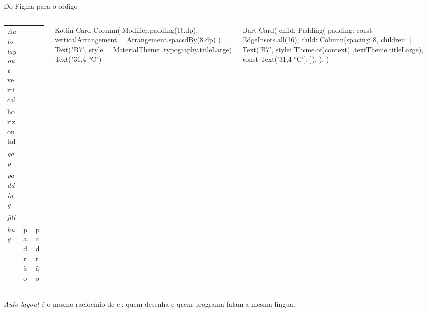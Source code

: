 \documentclass[aspectratio=169,10pt]{beamer}
\begin{document}
\begin{frame}[fragile]{Do Figma para o código}
  \begin{columns}[T]
    \begin{column}{0.33\textwidth}
      \scriptsize
      \begin{tabularx}{\linewidth}{@{}p{1.2cm} p{1.75cm} L@{}}
        \toprule
         &  &  \\
        \midrule
        \emph{Auto layout} vertical &  &  \\
        horizontal &  &  \\
        \emph{gap} &  &  \\
        \emph{padding} &  &  \\
        \emph{fill} &  &  \\
        \emph{hug} & padrão & padrão \\
        \bottomrule
      \end{tabularx}
    \end{column}
    \begin{column}{0.31\textwidth}
\begin{codigo}[title=Compose]{Kotlin}
Card {
  Column(
    Modifier.padding(16.dp),
    verticalArrangement =
      Arrangement.spacedBy(8.dp)
  ) {
    Text("B7", style = MaterialTheme
      .typography.titleLarge)
    Text("31,4 °C")
  }
}
\end{codigo}
    \end{column}
    \begin{column}{0.34\textwidth}
\begin{codigo}[title=Flutter]{Dart}
Card(
  child: Padding(
    padding: const EdgeInsets.all(16),
    child: Column(spacing: 8, children: [
      Text('B7', style: Theme.of(context)
          .textTheme.titleLarge),
      const Text('31,4 °C'),
    ]),
  ),
)
\end{codigo}
    \end{column}
  \end{columns}
  \begin{destaque}
    \emph{Auto layout} é o mesmo raciocínio de  e : quem desenha e quem programa falam a mesma língua.
  \end{destaque}
\end{frame}

\end{document}
